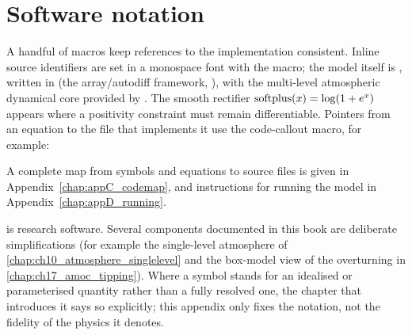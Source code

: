 \section{Software notation}

A handful of macros keep references to the implementation consistent. Inline
source identifiers are set in a monospace font with the 
macro; the model itself is \model, written in \jax{} (the array/autodiff
framework, \citealp{jax2018}), with the multi-level atmospheric dynamical core
provided by \dino{}. The smooth rectifier $\operatorname{softplus}(x)=\log(1+e^{x})$ appears
where a positivity constraint must remain differentiable. Pointers from an
equation to the file that implements it use the code-callout macro, for example:


\noindent A complete map from symbols and equations to source files is given in
Appendix~\ref{chap:appC_codemap}, and instructions for running the model in
Appendix~\ref{chap:appD_running}.

\begin{remark}
\model{} is research software. Several components documented in this book are
deliberate simplifications (for example the single-level atmosphere of
\ref{chap:ch10_atmosphere_singlelevel} and the box-model view of the overturning
in \ref{chap:ch17_amoc_tipping}). Where a symbol stands for an idealised or
parameterised quantity rather than a fully resolved one, the chapter that
introduces it says so explicitly; this appendix only fixes the notation, not the
fidelity of the physics it denotes.
\end{remark}
